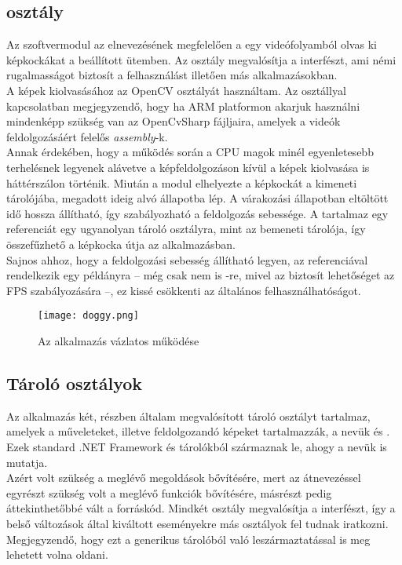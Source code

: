 \subsection{ osztály}

Az szoftvermodul az elnevezésének megfelelően a egy videófolyamból olvas ki képkockákat a beállított ütemben. Az osztály megvalósítja a  interfészt, ami némi rugalmasságot biztosít a felhasználást illetően más alkalmazásokban. \\
A képek kiolvasásához az OpenCV  osztályát használtam. Az osztállyal kapcsolatban megjegyzendő, hogy ha ARM platformon akarjuk használni mindenképp szükség van az OpenCvSharp  fájljaira, amelyek a videók feldolgozásáért felelős \textit{assembly}-k.\\
Annak érdekében, hogy a működés során a CPU magok minél egyenletesebb terhelésnek legyenek alávetve a képfeldolgozáson kívül a képek kiolvasása is háttérszálon történik. Miután a modul elhelyezte a képkockát a kimeneti tárolójába, megadott ideig alvó állapotba lép. A várakozási állapotban eltöltött idő hossza állítható, így szabályozható a feldolgozás sebessége. A  tartalmaz egy referenciát egy ugyanolyan tároló osztályra, mint az  bemeneti tárolója, így összefűzhető a képkocka útja az alkalmazásban.\\
Sajnos ahhoz, hogy a feldolgozási sebesség állítható legyen, az  referenciával rendelkezik egy  példányra -- még csak nem is -re, mivel az biztosít lehetőséget az FPS szabályozására --, ez kissé csökkenti az általános felhasználhatóságot.

\begin{figure}[h]
\texttt{[image: doggy.png]}
\centering
\caption{Az alkalmazás vázlatos működése}
\label{fig:doggy}
\end{figure}

\subsection{Tároló osztályok}

Az alkalmazás két, részben általam megvalósított tároló osztályt tartalmaz, amelyek a műveleteket, illetve feldolgozandó képeket tartalmazzák, a nevük  és . Ezek standard .NET Framework  és  tárolókból származnak le, ahogy a nevük is mutatja.\\
Azért volt szükség a meglévő megoldások bővítésére, mert az átnevezéssel egyrészt szükség volt a meglévő funkciók bővítésére, másrészt pedig áttekinthetőbbé vált a forráskód. Mindkét osztály megvalósítja a   interfészt, így a belső változások által kiváltott eseményekre más osztályok fel tudnak iratkozni. Megjegyzendő, hogy ezt a  generikus tárolóból való leszármaztatással is meg lehetett volna oldani.

